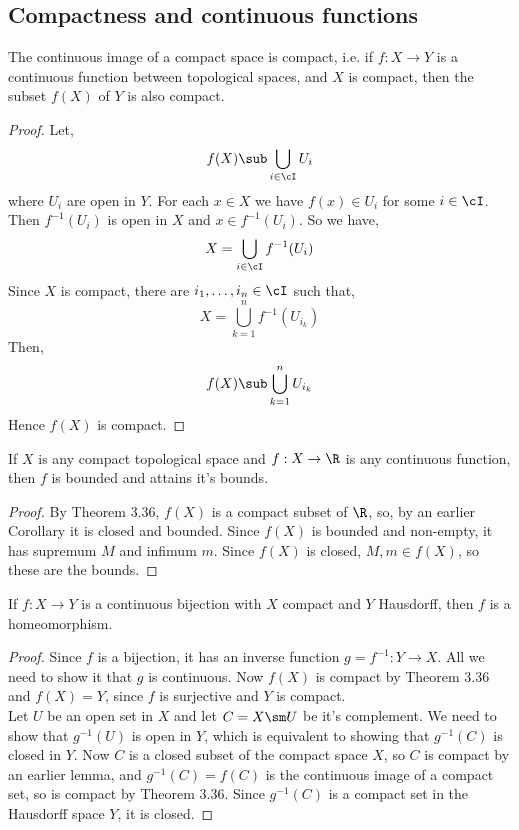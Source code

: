 \subsection{Compactness and continuous functions}
\begin{nthm}
  The continuous image of a compact space is compact, i.e. if $f : X \to Y$ is a continuous function between topological spaces, and $X$ is compact, then the subset $f(X)$ of $Y$ is also compact.
\end{nthm}
\begin{proof}
  Let,
  $$ f(X) \sub \bigcup_{i \in \cI} U_i $$
  where $U_i$ are open in $Y$. For each $x \in X$ we have $f(x) \in U_i$ for some $i \in \cI$. Then $f^{-1}(U_i)$ is open in $X$ and $x \in f^{-1}(U_i)$. So we have,
  $$ X= \bigcup_{i \in \cI} f^{-1}(U_i) $$
  Since $X$ is compact, there are $i_1, \dots, i_n \in \cI$ such that,
  $$ X = \bigcup_{k=1}^n f^{-1}(U_{i_k}) $$
  Then,
  $$ f(X) \sub \bigcup_{k=1}^n U_{i_k} $$
  Hence $f(X)$ is compact.
\end{proof}

\begin{ncor}
   If $X$ is any compact topological space and $f : X \to \R$ is any continuous function, then $f$ is bounded and attains it's bounds.
\end{ncor}
\begin{proof}
  By Theorem 3.36, $f(X)$ is a compact subset of $\R$, so, by an earlier Corollary it is closed and bounded. Since $f(X)$ is bounded and non-empty, it has supremum $M$ and infimum $m$. Since $f(X)$ is closed, $M, m \in f(X)$, so these are the bounds.
\end{proof}

\begin{nthm}
  If $f : X \to Y$ is a continuous bijection with $X$ compact and $Y$ Hausdorff, then $f$ is a homeomorphism.
\end{nthm}
\begin{proof}
  Since $f$ is a bijection, it has an inverse function $g = f^{-1} : Y \to X$. All we need to show it that $g$ is continuous. Now $f(X)$ is compact by Theorem 3.36 and $f(X) = Y$, since $f$ is surjective and $Y$ is compact. \\

  \noindent
  Let $U$ be an open set in $X$ and let $C = X\sm U$ be it's complement. We need to show that $g^{-1}(U)$ is open in $Y$, which is equivalent to showing that $g^{-1}(C)$ is closed in $Y$. Now $C$ is a closed subset of the compact space $X$, so $C$ is compact by an earlier lemma, and $g^{-1}(C) = f(C)$ is the continuous image of a compact set, so is compact by Theorem 3.36. Since $g^{-1}(C)$ is a compact set in the Hausdorff space $Y$, it is closed.
\end{proof}

